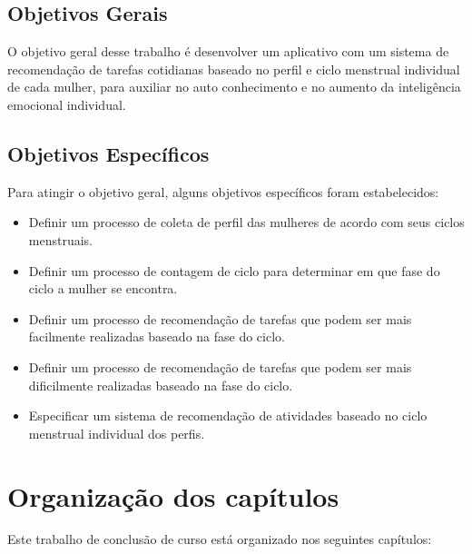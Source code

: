 \subsection{Objetivos Gerais}

O objetivo geral desse trabalho é desenvolver um aplicativo com um sistema de recomendação de tarefas cotidianas baseado no perfil e ciclo menstrual individual de cada mulher, para auxiliar no auto conhecimento e no aumento da inteligência emocional individual.

\subsection{Objetivos Específicos}

Para atingir o objetivo geral, alguns objetivos específicos foram estabelecidos:

\begin{itemize}

        \item Definir um processo de coleta de perfil das mulheres de acordo com seus ciclos menstruais.

        \item Definir um processo de contagem de ciclo para determinar em que fase do ciclo a mulher se encontra. 

        \item Definir um processo de recomendação de tarefas que podem ser  mais facilmente realizadas baseado na fase do ciclo. 

        \item Definir um processo de recomendação de tarefas que podem ser mais dificilmente realizadas baseado na fase do ciclo.

        \item Especificar um sistema de recomendação de atividades baseado no ciclo menstrual individual dos perfis. 

\end{itemize}

\section{Organização dos capítulos}

Este trabalho de conclusão de curso está organizado nos seguintes capítulos:

